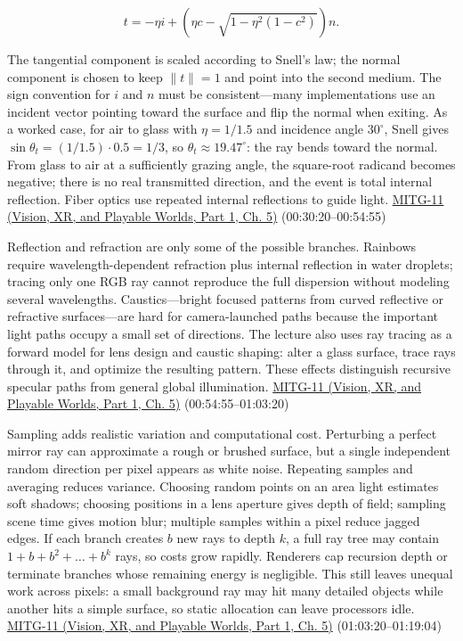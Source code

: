 \[
t=-\eta i+\left(\eta c-\sqrt{1-\eta^2(1-c^2)}\right)n.
\]

The tangential component is scaled according to Snell's law; the normal component is chosen to keep \(\|t\|=1\) and point into the second medium. The sign convention for \(i\) and \(n\) must be consistent---many implementations use an incident vector pointing toward the surface and flip the normal when exiting. As a worked case, for air to glass with \(\eta=1/1.5\) and incidence angle \(30^\circ\), Snell gives \(\sin\theta_t=(1/1.5)\cdot0.5=1/3\), so \(\theta_t\approx19.47^\circ\): the ray bends toward the normal. From glass to air at a sufficiently grazing angle, the square-root radicand becomes negative; there is no real transmitted direction, and the event is total internal reflection. Fiber optics use repeated internal reflections to guide light. \href{../07-Vision-XR-and-Playable-Worlds-P01/main.pdf\#nameddest=04-visual-computing-ii-ch036-mitg-11---ray-tracing}{MITG-11 (Vision, XR, and Playable Worlds, Part 1, Ch. 5)} (00:30:20--00:54:55)

Reflection and refraction are only some of the possible branches. Rainbows require wavelength-dependent refraction plus internal reflection in water droplets; tracing only one RGB ray cannot reproduce the full dispersion without modeling several wavelengths. Caustics---bright focused patterns from curved reflective or refractive surfaces---are hard for camera-launched paths because the important light paths occupy a small set of directions. The lecture also uses ray tracing as a forward model for lens design and caustic shaping: alter a glass surface, trace rays through it, and optimize the resulting pattern. These effects distinguish recursive specular paths from general global illumination. \href{../07-Vision-XR-and-Playable-Worlds-P01/main.pdf\#nameddest=04-visual-computing-ii-ch036-mitg-11---ray-tracing}{MITG-11 (Vision, XR, and Playable Worlds, Part 1, Ch. 5)} (00:54:55--01:03:20)

Sampling adds realistic variation and computational cost. Perturbing a perfect mirror ray can approximate a rough or brushed surface, but a single independent random direction per pixel appears as white noise. Repeating samples and averaging reduces variance. Choosing random points on an area light estimates soft shadows; choosing positions in a lens aperture gives depth of field; sampling scene time gives motion blur; multiple samples within a pixel reduce jagged edges. If each branch creates \(b\) new rays to depth \(k\), a full ray tree may contain \(1+b+b^2+\dots+b^k\) rays, so costs grow rapidly. Renderers cap recursion depth or terminate branches whose remaining energy is negligible. This still leaves unequal work across pixels: a small background ray may hit many detailed objects while another hits a simple surface, so static allocation can leave processors idle. \href{../07-Vision-XR-and-Playable-Worlds-P01/main.pdf\#nameddest=04-visual-computing-ii-ch036-mitg-11---ray-tracing}{MITG-11 (Vision, XR, and Playable Worlds, Part 1, Ch. 5)} (01:03:20--01:19:04)

